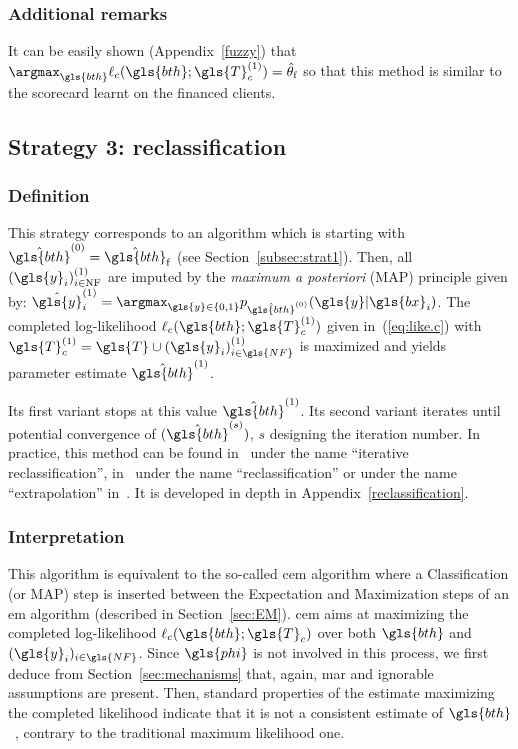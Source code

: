 \subsubsection{Additional remarks}
It can be easily shown (Appendix~\ref{fuzzy}) that $\argmax_{\gls{bth}} \ell_c(\gls{bth};\gls{T}_c^{(1)}) = \hat{\theta}_{\text{f}}$ so that this method is similar to the scorecard learnt on the financed clients.

\subsection{Strategy 3: reclassification}

\subsubsection{Definition}
This strategy corresponds to an algorithm which is starting with $\hat{\gls{bth}}^{(0)} = \hat{\gls{bth}}_\text{f}$ (see Section~\ref{subsec:strat1}). Then, all $(\gls{y}_i)^{(1)}_{i \in \text{NF}}$ are imputed by the {\it maximum a posteriori} (MAP) principle given by: $\hat{\gls{y}}^{(1)}_i = \argmax_{\gls{y} \in \{0,1\}} p_{\hat{\gls{bth}}^{(0)}}(\gls{y} | \gls{bx}_i)$. The completed log-likelihood $\ell_c(\gls{bth};\gls{T}_c^{(1)})$ given in~(\ref{eq:like.c}) with $\gls{T}_c^{(1)}=\gls{T} \cup (\gls{y}_i)^{(1)}_{i \in \gls{NF}}$ is maximized and yields parameter estimate $\hat{\gls{bth}}^{(1)}$.

Its first variant stops at this value $\hat{\gls{bth}}^{(1)}$. Its second variant iterates until potential convergence of $(\hat{\gls{bth}}^{(s)})$, $s$ designing the iteration number. In practice, this method can be found in~\cite{saporta} under the name ``iterative reclassification'', in~\cite{RI6} under the name ``reclassification'' or under the name ``extrapolation'' in~\cite{banasik}. It is developed in depth in Appendix~\ref{reclassification}.

\subsubsection{Interpretation}
This algorithm is equivalent to the so-called \gls{cem} algorithm where a Classification (or MAP) step is inserted between the Expectation and Maximization steps of an \gls{em} algorithm (described in Section~\ref{sec:EM}).
\gls{cem} aims at maximizing the completed log-likelihood $\ell_c(\gls{bth};\gls{T}_c)$ over both $\gls{bth}$ and $(\gls{y}_i)_{i \in \gls{NF}}$. Since $\gls{phi}$ is not involved in this process, we first deduce from Section~\ref{sec:mechanisms} that, again, \gls{mar} and ignorable assumptions are present. Then, standard properties of the estimate maximizing the completed likelihood indicate that it is not a consistent estimate of $\gls{bth}$~\cite{celeux1992classification}, contrary to the traditional maximum likelihood one.

